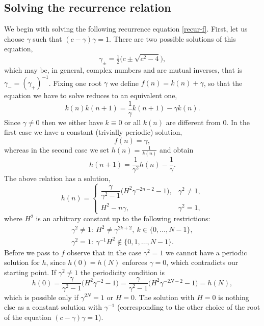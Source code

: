 \documentclass[10pt,a4paper]{amsart}
\numberwithin{equation}{section}
\begin{document}
\subsection{Solving the recurrence relation}
We begin with solving the following recurrence equation \eqref{recur-f}. First, let us choose $\gamma$ such that
$(c-\gamma)\gamma=1$. There are two possible solutions of this equation,
\[ \gamma_\pm = \tfrac{1}{2} \big(c \pm \sqrt{c^2-4}\big),\]
which may be, in general, complex numbers and are mutual inverses, that is $\gamma_- = (\gamma_+)^{-1}$.
Fixing one root $\gamma$ we define $f(n)=k(n)+\gamma$, so that the equation we have to solve reduces to
an equivalent one,
\begin{equation*}
k(n)k(n+1)=\frac{1}{\gamma}k(n+1)-\gamma k(n).
\end{equation*}
Since $\gamma\not=0$ then we either have $k\equiv 0$ or all $k(n)$ are different from $0$.
In the first case we have a constant (trivially periodic) solution,
\[ f(n) = \gamma, \]
whereas in the second case we set $h(n)=\frac{1}{k(n)}$ and obtain
\begin{equation*}
h(n+1)=\frac{1}{\gamma^2}h(n)-\frac{1}{\gamma}.
\end{equation*}
The above relation has a solution,
\begin{equation*}
h(n) =
\begin{cases}
\dfrac{\gamma}{\gamma^2-1 } \bigl( H^2 \gamma^{-2n-2} - 1 \bigr) , & \gamma^2 \not=1, \\
H^2 - n \gamma, & \gamma^2 = 1,
\end{cases}
\end{equation*}
where $H^2$ is an arbitrary constant up to the following restrictions:
\begin{gather*}
 \gamma^2 \not=1\colon \ H^2\neq \gamma^{2k+2}, \ k \in \{0,\ldots, N-1\}, \\
 \gamma^2 = 1\colon \ \gamma^{-1} H^2 \notin \{0,1,\ldots,N-1\}.
\end{gather*}
Before we pass to $f$ observe that in the case $\gamma^2=1$ we cannot have a periodic solution for $h$,
since $h(0)=h(N)$ enforces $\gamma=0$, which contradicts our starting point.
If $\gamma^2\not=1$ the periodicity condition is
\[ h(0) = \frac{\gamma}{\gamma^2-1 } \bigl( H^2 \gamma^{-2} - 1 \bigr) = \frac{\gamma}{\gamma^2-1 } \bigl( H^2 \gamma^{-2N-2} - 1 \bigr) = h(N), \]
which is possible only if $\gamma^{2N}=1$ or $H=0$. The solution with $H=0$ is nothing else as a constant solution with
$\gamma^{-1}$ (corresponding to the other choice of the root of the equation $(c-\gamma)\gamma=1$).
\end{document}
